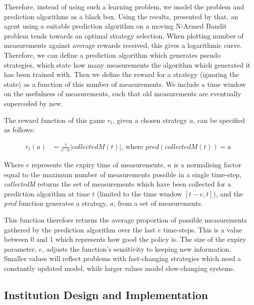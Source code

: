 Therefore, instead of using such a learning problem, we model the problem and
prediction algorithms as a black box. Using the results, presented by
\citet[p.43]{Sutton1998} that, an agent using a suitable prediction algorithm
on a moving N-Armed Bandit problem tends towards an optimal strategy
selection. When plotting number of measurements against average rewards
received, this gives a logarithmic curve. Therefore, we can define a
prediction algorithm which generates pseudo strategies, which state how many
measurements the algorithm which generated it has been trained with. Then we
define the reward for a strategy (ignoring the state) as a
function of this number of measurements. We include a time window on the
usefulness of measurements, such that old measurements are eventually
superceded by new.

The reward function of this game $r_t$, given a chosen strategy $a$, can be specified as follows:

\begin{align*}
r_t \left(a\right) &= \frac{1}{e\cdot n} \left|  \mathit{collectedM}\left(t\right)\right| \text{, where } \mathit{pred}\left( \mathit{collectedM}\left(t\right)\right)=a
\end{align*}

Where $e$ represents the expiry time of measurements, $n$ is a normalising
factor equal to the maximum number of measurements possible in a single time-step,
\emph{collectedM} returns the set of measurements which have been
collected for a prediction algorithm at time $t$ (limited to the time window
$[t-e,t]$), and the \emph{pred} function generates a strategy, $a$, from a set
of measurements.

This function therefore returns the average proportion of possible measurements gathered by the prediction algorithm over the last $e$ time-steps. This is a value between 0 and 1 which represents how good the
policy is. The size of the expiry parameter, $e$, adjusts the
function's sensitivity to keeping new information. Smaller values will reflect
problems with fast-changing strategies which need a constantly updated model,
while larger values model slow-changing systems.

\subsection{Institution Design and Implementation}

